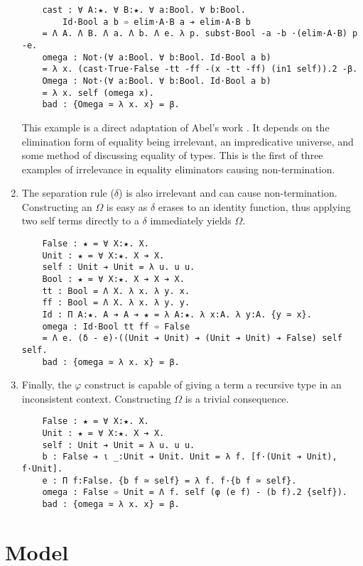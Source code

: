 \begin{enumerate}
{\begin{verbatim}
    cast : ∀ A:★. ∀ B:★. ∀ a:Bool. ∀ b:Bool.
        Id·Bool a b ➾ elim·A·B a ➔ elim·A·B b
    = Λ A. Λ B. Λ a. Λ b. Λ e. λ p. subst·Bool -a -b ·(elim·A·B) p -e.
    omega : Not·(∀ a:Bool. ∀ b:Bool. Id·Bool a b)
    = λ x. (cast·True·False -tt -ff -(x -tt -ff) (in1 self)).2 -β.
    Omega : Not·(∀ a:Bool. ∀ b:Bool. Id·Bool a b)
    = λ x. self (omega x).
    bad : {Omega ≃ λ x. x} = β.
\end{verbatim}
        This example is a direct adaptation of Abel's work \cite{abel2020_normalization}.
        It depends on the elimination form of equality being irrelevant, an impredicative universe, and some method of discussing equality of types.
        This is the first of three examples of irrelevance in equality eliminators causing non-termination.
    }
    \item {
        The separation rule ($\delta$) is also irrelevant and can cause non-termination.
        Constructing an $\Omega$ is easy as $\delta$ erases to an identity function, thus applying two self terms directly to a $\delta$ immediately yields $\Omega$.
\begin{verbatim}
    False : ★ = ∀ X:★. X.
    Unit : ★ = ∀ X:★. X ➔ X.
    self : Unit ➔ Unit = λ u. u u.
    Bool : ★ = ∀ X:★. X ➔ X ➔ X.
    tt : Bool = Λ X. λ x. λ y. x.
    ff : Bool = Λ X. λ x. λ y. y.
    Id : Π A:★. A ➔ A ➔ ★ = λ A:★. λ x:A. λ y:A. {y ≃ x}.
    omega : Id·Bool tt ff ➾ False
    = Λ e. (δ - e)·((Unit ➔ Unit) ➔ (Unit ➔ Unit) ➔ False) self self.
    bad : {omega ≃ λ x. x} = β.
\end{verbatim}
    }
    \item {
        Finally, the $\varphi$ construct is capable of giving a term a recursive type in an inconsistent context.
        Constructing $\Omega$ is a trivial consequence.
\begin{verbatim}
    False : ★ = ∀ X:★. X.
    Unit : ★ = ∀ X:★. X ➔ X.
    self : Unit ➔ Unit = λ u. u u.
    b : False ➔ ι _:Unit ➔ Unit. Unit = λ f. [f·(Unit ➔ Unit), f·Unit].
    e : Π f:False. {b f ≃ self} = λ f. f·{b f ≃ self}.
    omega : False ➾ Unit = Λ f. self (φ (e f) - (b f).2 {self}).
    bad : {omega ≃ λ x. x} = β.
\end{verbatim}
    }
\end{enumerate}

\section{Model}

